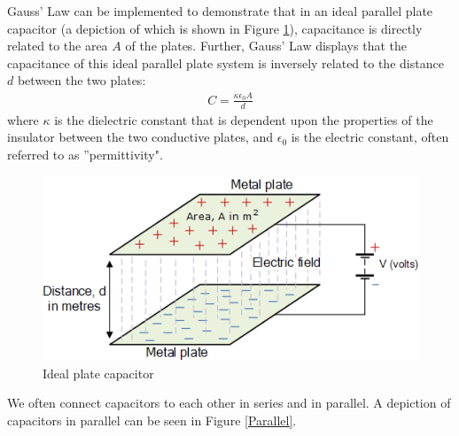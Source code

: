 \documentclass[oneside,12pt]{amsart}
\begin{document}
	\indent Gauss’ Law can be implemented to demonstrate that in an ideal parallel plate capacitor (a depiction of which is shown in Figure \ref{Ideal}), capacitance is directly related to the area $A$ of the plates. Further, Gauss’ Law displays that the capacitance of this ideal parallel plate system is inversely related to the distance $d$ between the two plates: 
	\begin{align*}
		C = \frac{\kappa \epsilon _{0}A}{d}
	\end{align*}
	where  $\kappa$ is the dielectric constant that is dependent upon the properties of the insulator between the two conductive plates, and $\epsilon_0$ is the electric constant, often referred to as ''permittivity".\\
	\begin{figure}[H]
		\includegraphics[width=\smallgraph,scale=0.01]{IdealCapacitor.png}
		\caption{Ideal plate capacitor}
		\label{Ideal}
	\end{figure}

	\indent We often connect capacitors to each other in series and in parallel. A depiction of capacitors in parallel can be seen in Figure \ref{Parallel}.\\
	 
\end{document}
